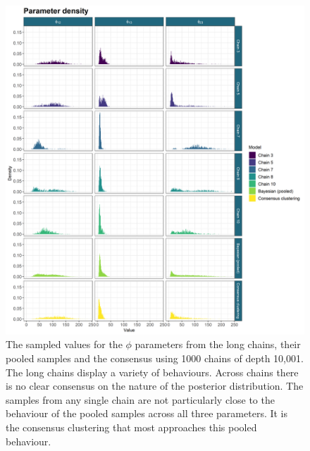 \documentclass[]{article}
\begin{document}
\begin{figure}
	\centering
	\includegraphics[scale=0.6]{./Images/Yeast/ComparisonDensities.png}
	\caption{The sampled values for the $\phi$ parameters from the long chains, their pooled samples and the consensus using 1000 chains of depth 10,001. The long chains display a variety of behaviours. Across chains there is no clear consensus on the nature of the posterior distribution. The samples from any single chain are not particularly close to the behaviour of the pooled samples across all three parameters. It is the consensus clustering that most approaches this pooled behaviour.}
	\label{fig:densityComparison}
\end{figure}




\newpage
\end{document}
